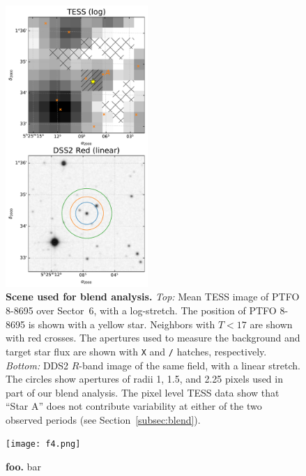 \documentclass[12pt,twocolumn,tighten]{aastex62}
\begin{document}
\begin{figure}[t]
	\begin{center}
		\leavevmode
		\includegraphics[width=0.48\textwidth]{f3.pdf}
	\end{center}
	\vspace{-0.7cm}
	\caption{ {\bf Scene used for blend analysis.}
		{\it Top:} Mean TESS image of PTFO 8-8695 over Sector~6, with a log-stretch.
		The position of PTFO 8-8695 is shown with a yellow star.
		Neighbors with $T<17$ are shown with red crosses.
		The apertures used to measure the background and target star flux
		are shown with \texttt{X} and \texttt{/} hatches, respectively.
		{\it Bottom:} DDS2 $R$-band image of the same field, with a linear stretch. The circles show
		apertures of radii 1, 1.5, and 2.25 pixels used in part of our blend
		analysis.
		The pixel level TESS data show that ``Star A''  does not contribute variability at either of the two observed periods (see Section~\ref{subsec:blend}).
		\label{fig:scene}
	}
\end{figure}

\begin{figure}[t]
	\begin{center}
		\leavevmode
		\texttt{[image: f4.png]}
	\end{center}
	\vspace{-0.7cm}
	\caption{ {\bf foo.}
		bar
		\label{fig:o_minus_c}
	}
\end{figure}
\end{document}
